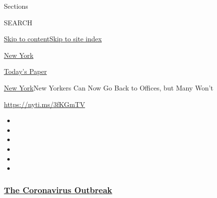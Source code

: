 Sections

SEARCH

\protect\hyperlink{site-content}{Skip to
content}\protect\hyperlink{site-index}{Skip to site index}

\href{https://www.nytimes3xbfgragh.onion/section/nyregion}{New York}

\href{https://myaccount.nytimes3xbfgragh.onion/auth/login?response_type=cookie\&client_id=vi}{}

\href{https://www.nytimes3xbfgragh.onion/section/todayspaper}{Today's
Paper}

\href{/section/nyregion}{New York}\textbar{}New Yorkers Can Now Go Back
to Offices, but Many Won't

\url{https://nyti.ms/3fKGmTV}

\begin{itemize}
\item
\item
\item
\item
\item
\item
\end{itemize}

\hypertarget{the-coronavirus-outbreak}{%
\subsubsection{\texorpdfstring{\href{https://www.nytimes3xbfgragh.onion/news-event/coronavirus?name=styln-coronavirus-national\&region=TOP_BANNER\&block=storyline_menu_recirc\&action=click\&pgtype=Article\&impression_id=3caed8f0-f4d3-11ea-b483-2d6765c32891\&variant=undefined}{The
Coronavirus
Outbreak}}{The Coronavirus Outbreak}}\label{the-coronavirus-outbreak}}

